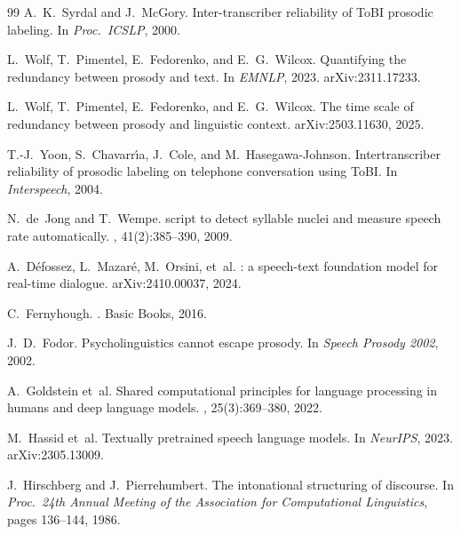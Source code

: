 \documentclass[11pt,letterpaper]{article}
\begin{document}
\begin{thebibliography}{99}
A.~K.\ Syrdal and J.~McGory.
\newblock Inter-transcriber reliability of {ToBI} prosodic labeling.
\newblock In {\em Proc.\ ICSLP}, 2000.

L.~Wolf, T.~Pimentel, E.~Fedorenko, and E.~G.\ Wilcox.
\newblock Quantifying the redundancy between prosody and text.
\newblock In {\em EMNLP}, 2023. arXiv:2311.17233.

L.~Wolf, T.~Pimentel, E.~Fedorenko, and E.~G.\ Wilcox.
\newblock The time scale of redundancy between prosody and linguistic context.
\newblock arXiv:2503.11630, 2025.

T.-J.\ Yoon, S.~Chavarr{\'\i}a, J.~Cole, and M.~Hasegawa-Johnson.
\newblock Intertranscriber reliability of prosodic labeling on telephone conversation using {ToBI}.
\newblock In {\em Interspeech}, 2004.

N.~de~Jong and T.~Wempe.
 script to detect syllable nuclei and measure speech rate automatically.
, 41(2):385--390, 2009.

A.~D{\'e}fossez, L.~Mazar{\'e}, M.~Orsini, et~al.
: a speech-text foundation model for real-time dialogue.
\newblock arXiv:2410.00037, 2024.

C.~Fernyhough.
.
\newblock Basic Books, 2016.

J.~D.\ Fodor.
\newblock Psycholinguistics cannot escape prosody.
\newblock In {\em Speech Prosody 2002}, 2002.

A.~Goldstein et~al.
\newblock Shared computational principles for language processing in humans and deep language models.
, 25(3):369--380, 2022.

M.~Hassid et~al.
\newblock Textually pretrained speech language models.
\newblock In {\em NeurIPS}, 2023. arXiv:2305.13009.

J.~Hirschberg and J.~Pierrehumbert.
\newblock The intonational structuring of discourse.
\newblock In {\em Proc.\ 24th Annual Meeting of the Association for Computational Linguistics}, pages 136--144, 1986.


\end{thebibliography}
\end{document}
